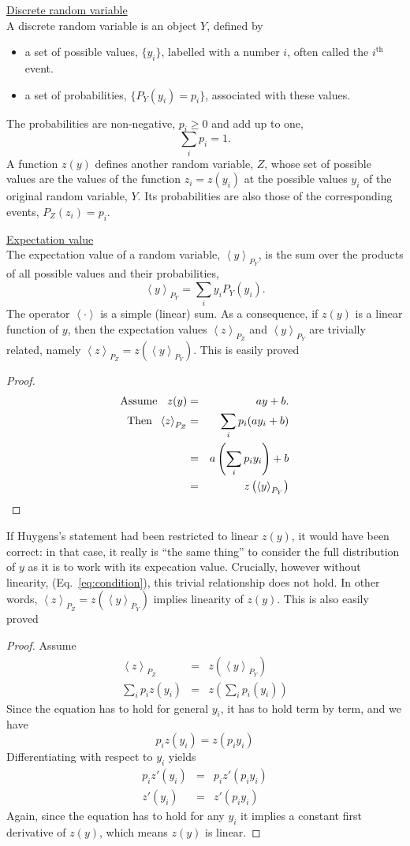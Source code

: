 \documentclass[pdftex]{article}
\newcommand{\ave}[1]{\left\langle#1 \right\rangle}
\newcommand{\bi}{\begin{itemize}}
\newcommand{\ei}{\end{itemize}}
\newcommand{\elabel}[1]{\label{eq:#1}}
\newcommand{\eref}[1]{(Eq.~\ref{eq:#1})}
\newcommand{\be}{\begin{equation}}
\newcommand{\ee}{\end{equation}}
\newcommand{\bea}{\begin{eqnarray}}
\newcommand{\eea}{\end{eqnarray}}
\begin{document}
\underline{Discrete random variable}\\
A discrete random variable is an object $Y$, defined by 
\bi
\item
a set of possible values, $\{y_i\}$, labelled with a number $i$, often called the $i^{\text{th}}$ event. 
\item
a set of probabilities, $\{P_Y(y_i)=p_i\}$, associated with these values.
\ei
The probabilities are non-negative, $p_i\geq0$ and add up to one,
\be
\sum_i p_i =1.
\ee
A function $z(y)$ defines another random variable, $Z$, whose set of possible values are the values of the function $z_i=z(y_i)$ at the possible values $y_i$ of the original random variable, $Y$. Its probabilities are also those of the corresponding events, $P_Z(z_i)=p_i$.

\underline{Expectation value}\\
The expectation value of a random variable, $\ave{y}_{P_Y}$, is the sum over the products of all possible values and their probabilities, 
\be
\ave{y}_{P_Y}=\sum_i y_i P_Y(y_i).
\ee
The operator $\ave{\cdot}$ is a simple (linear) sum. As a consequence, if $z(y)$ is a linear function of $y$, then the expectation values $\ave{z}_{P_Z}$ and
$\ave{y}_{P_Y}$ are trivially related, namely $\ave{z}_{P_Z}=z\left(\ave{y}_{P_Y}\right)$. 
This is easily proved
\begin{proof}
\bea
\text{Assume \hspace{.2cm}} z(y)&=&a y +b. \elabel{condition}\\
\text{Then \hspace{.1cm}}\ave{z}_{P_Z}&=& \sum_{i}p_i (a y_i + b)\\
&=&a \left(\sum_{i}p_i  y_i\right) + b\\
&=& z\left(\ave{y}_{P_Y}\right)
\eea
\end{proof}
If Huygens's statement had been restricted to linear $z(y)$, it would have been correct: in that case, it really is ``the same thing'' to consider the full distribution of $y$ as it is to work with its expecation value. 
Crucially, however without linearity, \eref{condition}, this trivial relationship does not hold. In other words, $\ave{z}_{P_Z}=z\left(\ave{y}_{P_Y}\right)$ implies linearity of $z(y)$. This is also easily proved
\begin{proof}
Assume
\bea
\ave{z}_{P_Z}&=&z\left(\ave{y}_{P_Y}\right)\\
\sum_{i}p_i z(y_i) &=& z\left(\sum_{i}p_i(y_i) \right)
\eea
Since the equation has to hold for general $y_i$, it has to hold term by term, and we have
\be
p_i z(y_i) = z (p_i y_i)
\ee
Differentiating with respect to $y_i$ yields
\bea
p_i z'(y_i) &=& p_i z' (p_i y_i)\\
z'(y_i) &=& z' (p_i y_i)
\eea
Again, since the equation has to hold for any $y_i$ it implies a constant first derivative of $z(y)$, which means $z(y)$ is linear.
\end{proof}
\end{document}
